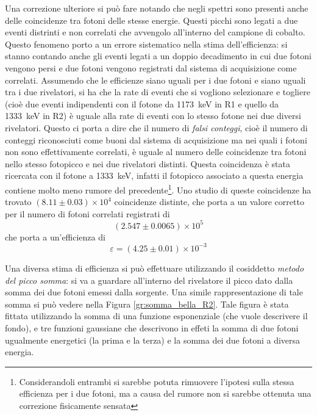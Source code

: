 Una correzione ulteriore si può fare notando che negli spettri sono presenti anche delle coincidenze tra fotoni delle stesse energie. Questi picchi sono legati a due eventi
distrinti e non correlati che avvengolo all'interno del campione di cobalto. Questo fenomeno porto a un errore sistematico nella stima dell'efficienza: si stanno contando
anche gli eventi legati a un doppio decadimento in cui due fotoni vengono persi e due fotoni vengono registrati dal sistema di acquisizione come correlati. Assumendo che le
efficienze siano uguali per i due fotoni e siano uguali tra i due rivelatori, si ha che la rate di eventi che si vogliono selezionare e togliere (cioè due eventi indipendenti
con il fotone da 1173~keV in R1 e quello da 1333~keV in R2) è uguale alla rate di eventi con lo stesso fotone nei due diversi rivelatori. Questo ci porta a dire che il numero
di \textit{falsi conteggi}, cioè il numero di conteggi riconosciuti come buoni dal sistema di acquisizione ma nei quali i fotoni non sono effettivamente correlati, è uguale
al numero delle coincidenze tra fotoni nello stesso fotopicco e nei due rivelatori distinti. Questa coincidenza è stata ricercata con il fotone a 1333~keV, infatti il
fotopicco associato a questa energia contiene molto meno rumore del precedente\footnote{Considerandoli entrambi si sarebbe potuta rimuovere l'ipotesi sulla stessa efficienza
per i due fotoni, ma a causa del rumore non si sarebbe ottenuta una correzione fisicamente sensata}. Uno studio di queste coincidenze ha trovato $(8.11 \pm 0.03)\times 10^4$
coincidenze distinte, che porta a un valore corretto per il numero di fotoni correlati registrati di
$$(2.547 \pm 0.0065)\times 10^5$$
che porta a un'efficienza di
$$\varepsilon = (4.25 \pm 0.01)\times 10^{-3}$$

\FloatBarrier
Una diversa stima di efficienza si può effettuare utilizzando il cosiddetto \textit{metodo del picco somma}: si va a guardare all'interno del rivelatore il picco dato dalla 
somma dei due fotoni emessi dalla sorgente. Una simile rappresentazione di tale somma si può vedere nella Figura \ref{gr:somma_bella_R2}. Tale figura è stata fittata 
utilizzando la somma di una funzione esponenziale (che vuole descrivere il fondo), e tre funzioni gaussiane che descrivono in effeti la somma di due fotoni ugualmente energetici
(la prima e la terza) e la somma dei due fotoni a diversa energia.\\


